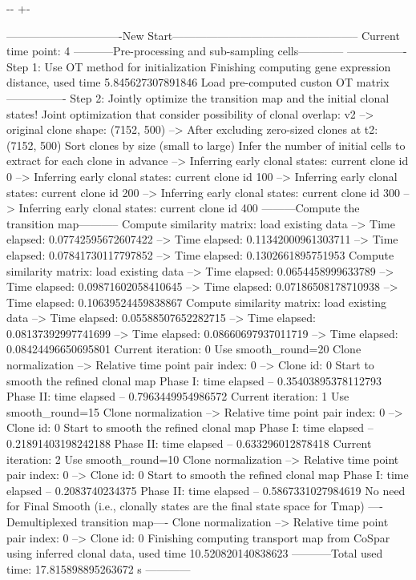 \documentclass[letterpaper,10pt,english]{sphinxmanual}
\newlength\nbsphinxcodecellspacing
\begin{document}
{

\kern-\sphinxverbatimsmallskipamount\kern-\baselineskip
\kern+\FrameHeightAdjust\kern-\fboxrule
\vspace{\nbsphinxcodecellspacing}

\begin{sphinxVerbatim}[commandchars=\\\{\}]
-------------------------------New Start--------------------------------------------------
Current time point: 4
-----------Pre-processing and sub-sampling cells------------
----------------
Step 1: Use OT method for initialization
Finishing computing gene expression distance, used time 5.845627307891846
Load pre-computed custon OT matrix
----------------
Step 2: Jointly optimize the transition map and the initial clonal states!
Joint optimization that consider possibility of clonal overlap: v2
--> original clone shape: (7152, 500)
--> After excluding zero-sized clones at t2: (7152, 500)
Sort clones by size (small to large)
Infer the number of initial cells to extract for each clone in advance
--> Inferring early clonal states: current clone id 0
--> Inferring early clonal states: current clone id 100
--> Inferring early clonal states: current clone id 200
--> Inferring early clonal states: current clone id 300
--> Inferring early clonal states: current clone id 400
---------Compute the transition map-----------
Compute similarity matrix: load existing data
--> Time elapsed:  0.07742595672607422
--> Time elapsed:  0.11342000961303711
--> Time elapsed:  0.07841730117797852
--> Time elapsed:  0.1302661895751953
Compute similarity matrix: load existing data
--> Time elapsed:  0.0654458999633789
--> Time elapsed:  0.09871602058410645
--> Time elapsed:  0.07186508178710938
--> Time elapsed:  0.10639524459838867
Compute similarity matrix: load existing data
--> Time elapsed:  0.05588507652282715
--> Time elapsed:  0.08137392997741699
--> Time elapsed:  0.08660697937011719
--> Time elapsed:  0.08424496650695801
Current iteration: 0
Use smooth\_round=20
Clone normalization
--> Relative time point pair index: 0
--> Clone id: 0
Start to smooth the refined clonal map
Phase I: time elapsed --  0.35403895378112793
Phase II: time elapsed --  0.7963449954986572
Current iteration: 1
Use smooth\_round=15
Clone normalization
--> Relative time point pair index: 0
--> Clone id: 0
Start to smooth the refined clonal map
Phase I: time elapsed --  0.21891403198242188
Phase II: time elapsed --  0.633296012878418
Current iteration: 2
Use smooth\_round=10
Clone normalization
--> Relative time point pair index: 0
--> Clone id: 0
Start to smooth the refined clonal map
Phase I: time elapsed --  0.2083740234375
Phase II: time elapsed --  0.5867331027984619
No need for Final Smooth (i.e., clonally states are the final state space for Tmap)
----Demultiplexed transition map----
Clone normalization
--> Relative time point pair index: 0
--> Clone id: 0
Finishing computing transport map from CoSpar using inferred clonal data, used time 10.520820140838623
-----------Total used time: 17.815898895263672 s ------------
\end{sphinxVerbatim}
}
\end{document}
